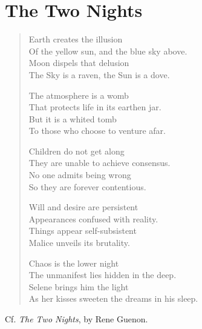 \section{The Two Nights}

\begin{verse}
\begin{patverse}
Earth creates the illusion\\
Of the yellow sun, and the blue sky above.\\
Moon dispels that delusion\\
The Sky is a raven, the Sun is a dove.
\end{patverse}

\begin{patverse}
The atmosphere is a womb\\
That protects life in its earthen jar.\\
But it is a whited tomb\\
To those who choose to venture afar.
\end{patverse}

\begin{patverse}
Children do not get along\\
They are unable to achieve consensus.\\
No one admits being wrong\\
So they are forever contentious.
\end{patverse}

\begin{patverse}
Will and desire are persistent\\
Appearances confused with reality.\\
Things appear self-subsistent\\
Malice unveils its brutality.
\end{patverse}

\begin{patverse}
Chaos is the lower night\\
The unmanifest lies hidden in the deep.\\
Selene brings him the light\\
As her kisses sweeten the dreams in his sleep.
\end{patverse}
\end{verse}

Cf. \emph{The Two Nights}, by Rene Guenon.




